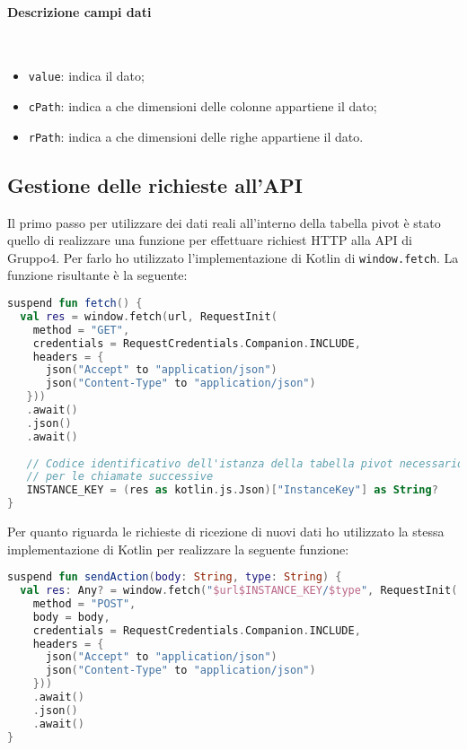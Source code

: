 \paragraph{Descrizione campi dati} \mbox{} \\
\begin{itemize}
	\item \verb|value|: indica il dato;
	\item \verb|cPath|: indica a che dimensioni delle colonne appartiene il dato;
	\item \verb|rPath|: indica a che dimensioni delle righe appartiene il dato.
\end{itemize}

\subsection{Gestione delle richieste all'API}
Il primo passo per utilizzare dei dati reali all'interno della tabella pivot è stato quello di realizzare una funzione per effettuare richiest HTTP alla API di Gruppo4. Per farlo ho utilizzato l'implementazione di Kotlin di \verb|window.fetch|. La funzione risultante è la seguente:
\begin{lstlisting}[caption={Funzione fetch()}, label={lst:bodycells}, language=Kotlin]
suspend fun fetch() {
  val res = window.fetch(url, RequestInit(
    method = "GET",
    credentials = RequestCredentials.Companion.INCLUDE,
    headers = {
      json("Accept" to "application/json")
      json("Content-Type" to "application/json")
   }))
   .await()
   .json()
   .await()
   
   // Codice identificativo dell'istanza della tabella pivot necessario
   // per le chiamate successive
   INSTANCE_KEY = (res as kotlin.js.Json)["InstanceKey"] as String?
}
\end{lstlisting}
Per quanto riguarda le richieste di ricezione di nuovi dati ho utilizzato la stessa implementazione di Kotlin per realizzare la seguente funzione:
\begin{lstlisting}[caption={Funzione sendAction()}, label={lst:bodycells}, language=Kotlin]
suspend fun sendAction(body: String, type: String) {
  val res: Any? = window.fetch("$url$INSTANCE_KEY/$type", RequestInit(
    method = "POST",
    body = body,
    credentials = RequestCredentials.Companion.INCLUDE,
    headers = {
      json("Accept" to "application/json")
      json("Content-Type" to "application/json")
    }))
    .await()
    .json()
    .await()
}
\end{lstlisting}
